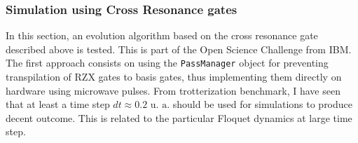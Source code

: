     \hypertarget{simulation-using-cross-resonance-gates}{%
\subsubsection{Simulation using Cross Resonance
gates}\label{simulation-using-cross-resonance-gates}}

In this section, an evolution algorithm based on the cross resonance
gate described above is tested. This is part of the Open Science
Challenge from IBM. The first approach consists on using the
\texttt{PassManager} object for preventing transpilation of RZX gates to
basis gates, thus implementing them directly on hardware using microwave
pulses. From trotterization benchmark, I have seen that at least a time
step \(dt \approx 0.2 \text{ u. a.}\) should be used for simulations to
produce decent outcome. This is related to the particular Floquet
dynamics at large time step.

